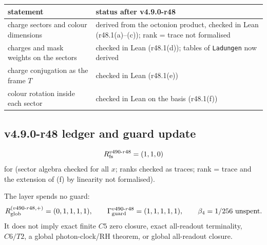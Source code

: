 \begin{center}
\small
\begin{tabular}{@{}>{\raggedright\arraybackslash}p{}>{\raggedright\arraybackslash}p{}@{}}
\toprule
statement & status after v4.9.0-r48\\
\midrule
charge sectors and colour dimensions & derived from the octonion product, checked in Lean (r48.1(a)--(c)); rank = trace not formalised\\
charges and mask weights on the sectors & checked in Lean (r48.1(d)); tables of \texttt{Ladungen} now derived\\
charge conjugation as the frame \(T\) & checked in Lean (r48.1(e))\\
colour rotation inside each sector & checked in Lean on the basis (r48.1(f))\\
\bottomrule
\end{tabular}
\end{center}

\subsection*{v4.9.0-r48 ledger and guard update}
\label{subsec:v490-r48-ledger-guard}

\[
R_{\rm fs}^{v490\text{-}r48}=(1,1,0)
\]
for (sector algebra checked for all \(x\); ranks checked as traces; rank = trace and the extension of (f) by linearity not formalised).

The layer spends no guard:
\[
R_{\rm glob}^{(v490\text{-}r48,+)}=(0,1,1,1,1),
\qquad
\Gamma_{\rm guard}^{v490\text{-}r48}=(1,1,1,1,1),
\qquad
\beta_4=1/256\ \text{unspent}.
\]
It does not imply exact finite \(C5\) zero closure, exact all-readout terminality,
\(C6/T2\), a global photon-clock/RH theorem, or global all-readout closure.
